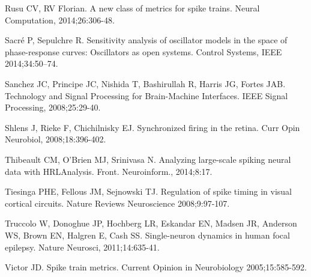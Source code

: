 \documentclass[10pt,twocolumn]{elsart5p}
\begin{document}
\begin{thebibliography}{25}
Rusu CV, RV Florian. A new class of metrics for spike trains. Neural Computation, 2014;26:306-48.

Sacr\'{e} P, Sepulchre R. Sensitivity analysis of oscillator models in the space of phase-response curves: Oscillators as open systems. Control Systems, IEEE 2014;34:50–74.

Sanchez JC, Principe JC, Nishida T, Bashirullah R, Harris JG, Fortes JAB. Technology and Signal Processing for Brain-Machine Interfaces. IEEE Signal Processing, 2008;25:29-40.

Shlens J, Rieke F, Chichilnisky EJ. Synchronized firing in the retina. Curr Opin Neurobiol, 2008;18:396-402.

Thibeault CM, {O'Brien} MJ, Srinivasa N. Analyzing large-scale spiking neural data with HRLAnalysis. Front. Neuroinform., 2014;8:17.

Tiesinga PHE, Fellous JM, Sejnowski TJ. Regulation of spike timing in visual cortical circuits. Nature Reviews Neuroscience 2008;9:97-107.

Truccolo W, Donoghue JP, Hochberg LR, Eskandar EN, Madsen JR, Anderson WS, Brown EN, Halgren E, Cash SS. Single-neuron dynamics in human focal epilepsy. Nature Neurosci, 2011;14:635-41.

Victor JD. Spike train metrics. Current Opinion in Neurobiology 2005;15:585-592.

\end{thebibliography}





%

%
%
%
\end{document}
